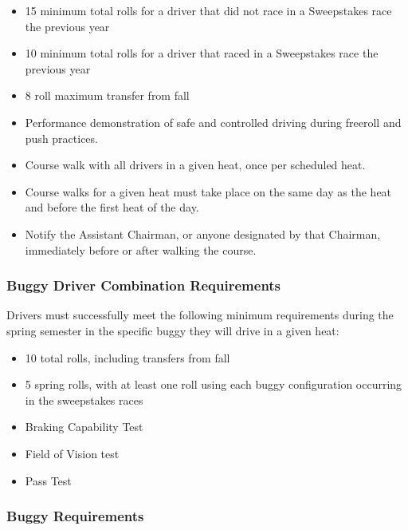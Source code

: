 	\begin{itemize}

		\item 15 minimum total rolls for a driver that did not race in a Sweepstakes race the previous year

		\item 10 minimum total rolls for a driver that raced in a Sweepstakes race the previous year

		\item 8 roll maximum transfer from fall

		\item Performance demonstration of safe and controlled driving during freeroll and push practices.

		\item Course walk with all drivers in a given heat, once per scheduled heat.

		\item Course walks for a given heat must take place on the same day as the heat and before the first heat of the day.

		\item Notify the Assistant Chairman, or anyone designated by that Chairman, immediately before or after walking the course.

	\end{itemize}

\subsubsection{Buggy Driver Combination Requirements}
	Drivers must successfully meet the following minimum requirements during the spring semester in the specific buggy they will drive in a given heat:

	\begin{itemize}

		\item 10 total rolls, including transfers from fall
		\item 5 spring rolls, with at least one roll using each buggy configuration occurring in the sweepstakes races
		\item Braking Capability Test
		\item Field of Vision test
		\item Pass Test

	\end{itemize}

\subsubsection{Buggy Requirements}

